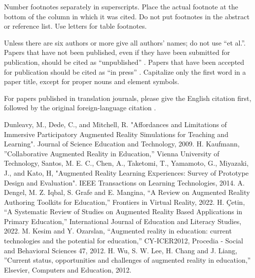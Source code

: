 \documentclass[conference]{IEEEtran}
\begin{document}
Number footnotes separately in superscripts. Place the actual footnote at 
the bottom of the column in which it was cited. Do not put footnotes in the 
abstract or reference list. Use letters for table footnotes.

Unless there are six authors or more give all authors' names; do not use 
``et al.''. Papers that have not been published, even if they have been 
submitted for publication, should be cited as ``unpublished'' \cite{b4}. Papers 
that have been accepted for publication should be cited as ``in press'' \cite{b5}. 
Capitalize only the first word in a paper title, except for proper nouns and 
element symbols.

For papers published in translation journals, please give the English 
citation first, followed by the original foreign-language citation \cite{b6}.

\begin{thebibliography}{00}
  Dunleavy, M., Dede, C., and Mitchell, R. "Affordances and Limitations of Immersive Participatory Augmented Reality Simulations for Teaching and Learning". Journal of Science Education and Technology, 2009.
 H. Kaufmann, ''Collaborative Augmented Reality in Education,'' Vienna University of Technology, 
 Santos, M. E. C., Chen, A., Taketomi, T., Yamamoto, G., Miyazaki, J., and Kato, H, "Augmented Reality Learning Experiences: Survey of Prototype
Design and Evaluation". IEEE Transactions on Learning Technologies, 2014.
 A. Dengel, M. Z. Iqbal, S. Grafe and E. Mangina, ``A Review on Augmented Reality Authoring Toolkits for Education,'' Frontiers in Virtual Reality, 2022.
 H. Çetin, ``A Systematic Review of Studies on Augmented Reality Based Applications in Primary Education,'' International Journal of Education and Literacy Studies, 2022.
 M. Kesim and Y. Ozarslan, ``Augmented reality in education: current technologies and the potential for education,'' CY-ICER2012, Procedia - Social and Behavioral Sciences 47, 2012.
 H. Wu, S. W. Lee, H. Chang and J. Liang, ''Current status, opportunities and challenges of augmented reality in education,'' Elsevier, Computers and Education, 2012.
\end{thebibliography}
\vspace{12pt}
\end{document}

